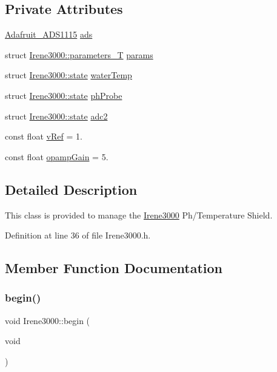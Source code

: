 \subsection*{Private Attributes}
\begin{DoxyCompactItemize}
\item 
\hyperlink{class_adafruit___a_d_s1115}{Adafruit\+\_\+\+A\+D\+S1115} \hyperlink{class_irene3000_a1215e77ba761c9908d80d691f149e135}{ads}
\item 
struct \hyperlink{struct_irene3000_1_1parameters___t}{Irene3000\+::parameters\+\_\+T} \hyperlink{class_irene3000_a136585a5ee7f9ac6ab52175fa153f8e3}{params}
\item 
struct \hyperlink{struct_irene3000_1_1state}{Irene3000\+::state} \hyperlink{class_irene3000_af05612c78c758ce9db316c75ad937130}{water\+Temp}
\item 
struct \hyperlink{struct_irene3000_1_1state}{Irene3000\+::state} \hyperlink{class_irene3000_a997a4ee466fa1d5416e07e444965dc9e}{ph\+Probe}
\item 
struct \hyperlink{struct_irene3000_1_1state}{Irene3000\+::state} \hyperlink{class_irene3000_aae3a95a1c83c766cd2f299ce471c337e}{adc2}
\item 
const float \hyperlink{class_irene3000_a018e7ff9bee57e6d2b298667a668ba7e}{v\+Ref} = 1.
\item 
const float \hyperlink{class_irene3000_a4e588985ca74e5076029d5dee81034f2}{opamp\+Gain} = 5.
\end{DoxyCompactItemize}


\subsection{Detailed Description}
This class is provided to manage the \hyperlink{class_irene3000}{Irene3000} Ph/\+Temperature Shield. 

Definition at line 36 of file Irene3000.\+h.



\subsection{Member Function Documentation}
\mbox{\label{class_irene3000_ad5891806c500ae1007afe52b9e304c2b}} 
\subsubsection{\texorpdfstring{begin()}{begin()}}
{\footnotesize\ttfamily void Irene3000\+::begin (\begin{DoxyParamCaption}\item[{void}]{ }\end{DoxyParamCaption})}


